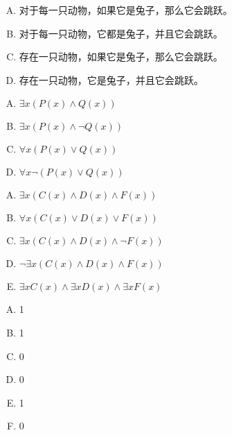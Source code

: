 {{        %
        \begin{practices}
            \begin{enumerate}[A.]
                \item 对于每一只动物，如果它是兔子，那么它会跳跃。
                \item 对于每一只动物，它都是兔子，并且它会跳跃。
                \item 存在一只动物，如果它是兔子，那么它会跳跃。
                \item 存在一只动物，它是兔子，并且它会跳跃。
            \end{enumerate}
        \end{practices}

        \begin{practices}
            \begin{enumerate}[A.]
                \item $\exists x (P(x) \wedge Q(x))$
                \item $\exists x (P(x) \wedge \neg Q(x))$
                \item $\forall x (P(x) \vee Q(x))$
                \item $\forall x \neg (P(x) \vee Q(x))$
            \end{enumerate}
        \end{practices}

        \begin{practices}
            \begin{enumerate}[A.]
                \item $\exists x (C(x) \wedge D(x) \wedge F(x))$
                \item $\forall x (C(x) \vee D(x) \vee F(x))$
                \item $\exists x (C(x) \wedge D(x) \wedge \neg F(x))$
                \item $\neg \exists x (C(x) \wedge D(x) \wedge F(x))$
                \item $\exists x C(x) \wedge \exists x D(x) \wedge \exists x F(x)$
            \end{enumerate}
        \end{practices}

        \begin{practices}
            \begin{enumerate}[A.]
                \item 1
                \item 1
                \item 0
                \item 0
                \item 1
                \item 0
            \end{enumerate}
        \end{practices}

}}
